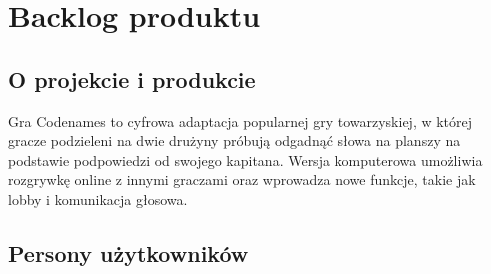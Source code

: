 \documentclass[12pt,a4paper,colorlinks=true,linkcolor=NavyBlue,citecolor=red,urlcolor=NavyBlue]{book}
\begin{document}
\chapter{Backlog produktu}
\section{O projekcie i produkcie}
Gra Codenames to cyfrowa adaptacja popularnej gry towarzyskiej, w której gracze podzieleni na dwie drużyny próbują odgadnąć słowa na planszy na podstawie podpowiedzi od swojego kapitana. Wersja komputerowa umożliwia rozgrywkę online z innymi graczami oraz wprowadza nowe funkcje, takie jak lobby i komunikacja głosowa.
\vspace{1cm}

\section{Persony użytkowników}
\end{document}

